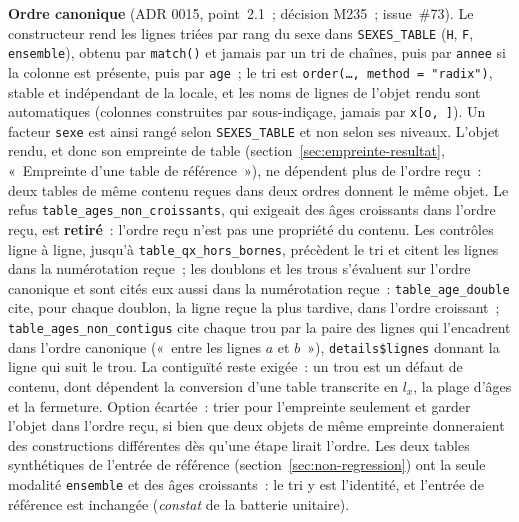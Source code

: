 \documentclass[a4paper,11pt]{article}
\newcommand{\code}[1]{\texttt{\small #1}}
\begin{document}
\medskip
\noindent
\textbf{Ordre canonique} (ADR 0015, point~2.1~; décision M235~; issue~\#73).
Le constructeur rend les lignes triées par rang du sexe dans
\code{SEXES\_TABLE} (\code{H}, \code{F}, \code{ensemble}), obtenu par
\code{match()} et jamais par un tri de chaînes, puis par \code{annee} si
la colonne est présente, puis par \code{age}~; le tri est
\code{order(\ldots, method = "radix")}, stable et indépendant de la
locale, et les noms de lignes de l'objet rendu sont automatiques (colonnes
construites par sous-indiçage, jamais par \code{x[o, ]}). Un facteur
\code{sexe} est ainsi rangé selon \code{SEXES\_TABLE} et non selon ses
niveaux. L'objet rendu, et donc son empreinte de table
(section~\ref{sec:empreinte-resultat}, «~Empreinte d'une table de
référence~»), ne dépendent plus de l'ordre reçu~: deux tables de même
contenu reçues dans deux ordres donnent le même objet. Le refus
\code{table\_ages\_non\_croissants}, qui exigeait des âges croissants
dans l'ordre reçu, est \textbf{retiré}~: l'ordre reçu n'est pas une
propriété du contenu. Les contrôles ligne à ligne, jusqu'à
\code{table\_qx\_hors\_bornes}, précèdent le tri et citent les lignes
dans la numérotation reçue~; les doublons et les trous s'évaluent sur
l'ordre canonique et sont cités eux aussi dans la numérotation
reçue~: \code{table\_age\_double} cite, pour chaque doublon, la ligne
reçue la plus tardive, dans l'ordre croissant~; \code{table\_ages\_non\_contigus}
cite chaque trou par la paire des lignes qui l'encadrent dans l'ordre
canonique («~entre les lignes $a$ et $b$~»), \code{details\$lignes} donnant
la ligne qui suit le trou. La contiguïté reste exigée~: un trou est un
défaut de contenu, dont dépendent la conversion d'une table transcrite en
$l_x$, la plage d'âges et la fermeture. Option écartée~: trier pour l'empreinte
seulement et garder l'objet dans l'ordre reçu, si bien que deux objets de
même empreinte donneraient des constructions différentes dès qu'une étape
lirait l'ordre. Les deux tables synthétiques de l'entrée de référence
(section~\ref{sec:non-regression}) ont la seule modalité \code{ensemble} et
des âges croissants~: le tri y est l'identité, et l'entrée de référence est
inchangée (\emph{constat} de la batterie unitaire).
\end{document}
